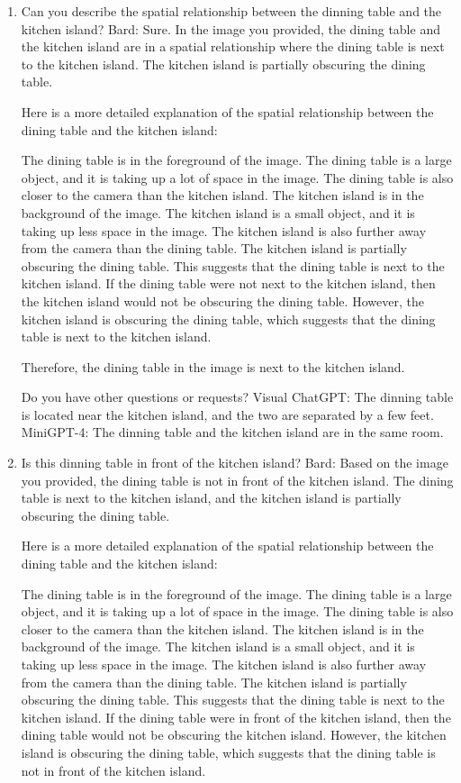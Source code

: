 \begin{enumerate}
    \item Can you describe the spatial relationship between the dinning table and the kitchen island?
    \subitem Bard: 
    Sure. In the image you provided, the dining table and the kitchen island are in a spatial relationship where the dining table is next to the kitchen island. The kitchen island is partially obscuring the dining table.
    
    Here is a more detailed explanation of the spatial relationship between the dining table and the kitchen island:
    
    The dining table is in the foreground of the image. The dining table is a large object, and it is taking up a lot of space in the image. The dining table is also closer to the camera than the kitchen island.
    The kitchen island is in the background of the image. The kitchen island is a small object, and it is taking up less space in the image. The kitchen island is also further away from the camera than the dining table.
    The kitchen island is partially obscuring the dining table. This suggests that the dining table is next to the kitchen island.
    If the dining table were not next to the kitchen island, then the kitchen island would not be obscuring the dining table. However, the kitchen island is obscuring the dining table, which suggests that the dining table is next to the kitchen island.
    
    Therefore, the dining table in the image is next to the kitchen island.
    
    Do you have other questions or requests?
    \subitem Visual ChatGPT: The dinning table is located near the kitchen island, and the two are separated by a few feet.
    \subitem MiniGPT-4: The dinning table and the kitchen island are in the same room.
    \item Is this dinning table in front of the kitchen island?
    \subitem Bard: Based on the image you provided, the dining table is not in front of the kitchen island. The dining table is next to the kitchen island, and the kitchen island is partially obscuring the dining table.

    Here is a more detailed explanation of the spatial relationship between the dining table and the kitchen island:
    
    The dining table is in the foreground of the image. The dining table is a large object, and it is taking up a lot of space in the image. The dining table is also closer to the camera than the kitchen island.
    The kitchen island is in the background of the image. The kitchen island is a small object, and it is taking up less space in the image. The kitchen island is also further away from the camera than the dining table.
    The kitchen island is partially obscuring the dining table. This suggests that the dining table is next to the kitchen island.
    If the dining table were in front of the kitchen island, then the dining table would not be obscuring the kitchen island. However, the kitchen island is obscuring the dining table, which suggests that the dining table is not in front of the kitchen island.
    

\end{enumerate}
